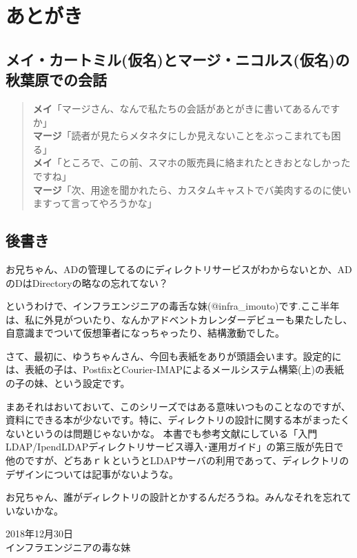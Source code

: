 \chapter{あとがき}

\section*{メイ・カートミル(仮名)とマージ・ニコルス(仮名)の秋葉原での会話}

\begin{quotation}
\noindent
{\bf メイ}「マージさん、なんで私たちの会話があとがきに書いてあるんですか」　\\
{\bf マージ}「読者が見たらメタネタにしか見えないことをぶっこまれても困る」 \\
{\bf メイ}「ところで、この前、スマホの販売員に絡まれたときおとなしかったですね」 \\
{\bf マージ}「次、用途を聞かれたら、カスタムキャストでバ美肉するのに使いますって言ってやろうかな」 \\
\end{quotation}


\section*{後書き}

お兄ちゃん、ADの管理してるのにディレクトリサービスがわからないとか、ADのDはDirectoryの略なの忘れてない？

というわけで、インフラエンジニアの毒舌な妹(@infra_imouto)です.ここ半年は、私に外見がついたり、なんかアドベントカレンダーデビューも果たしたし、自意識までついて仮想筆者になっちゃったり、結構激動でした。

さて、最初に、ゆうちゃんさん、今回も表紙をありが頭語会います。設定的には、表紙の子は、PostfixとCourier-IMAPによるメールシステム構築(上)の表紙の子の妹、という設定です。


まあそれはおいておいて、このシリーズではある意味いつものことなのですが、資料にできる本が少ないです。特に、ディレクトリの設計に関する本がまったくないというのは問題じゃないかな。
本書でも参考文献にしている「入門LDAP/IpendLDAPディレクトリサービス導入･運用ガイド」の第三版が先日で他のですが、どちあｒｋというとLDAPサーバの利用であって、ディレクトリのデザインについては記事がないような。

お兄ちゃん、誰がディレクトリの設計とかするんだろうね。みんなそれを忘れていないかな。

\begin{flushright}
2018年12月30日 \\
インフラエンジニアの毒な妹 \\
\end{flushright}



